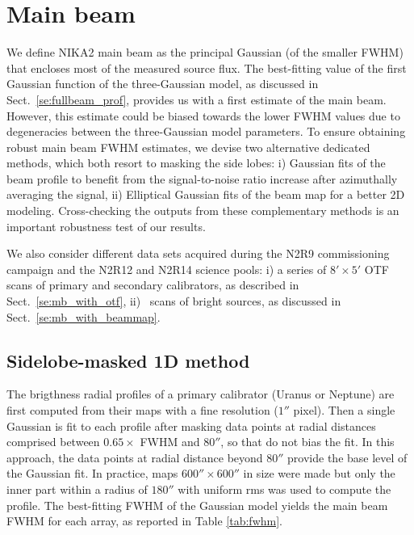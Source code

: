 \section{Main beam}%
\label{se:MB}


We define NIKA2 main beam as the principal Gaussian (of the smaller FWHM)
that encloses most of the measured source flux. The best-fitting value
of the first Gaussian function of the
three-Gaussian model, as discussed in Sect.~\ref{se:fullbeam_prof},
provides us with a first estimate of the main beam. %
However, this estimate could be biased towards the lower FWHM values due to
degeneracies between the three-Gaussian model parameters. To ensure
obtaining robust main beam FWHM estimates, we devise %
two alternative dedicated
methods, which both resort to masking the side lobes: i) Gaussian fits
of the beam profile to benefit from the signal-to-noise ratio increase
after azimuthally averaging the signal, ii) Elliptical Gaussian fits
of the beam map for a better 2D modeling.
Cross-checking the outputs from these complementary methods is an
important robustness test of our results.

We also consider different data sets acquired during the N2R9
commissioning campaign and the N2R12 and N2R14 science pools: i) a
series of $8' \times 5'$ OTF scans of primary and secondary
calibrators, as described in Sect.~\ref{se:mb_with_otf}, ii)
\bm\ scans of bright sources, as discussed in
Sect.~\ref{se:mb_with_beammap}.



\subsection{Sidelobe-masked 1D method}%
\label{se:beam_mb_1D} 

The brigthness radial profiles of a primary calibrator (Uranus or
Neptune) are first computed from their maps with a fine resolution
($1''$ pixel). Then a single Gaussian is fit to each profile after
masking data points at radial distances comprised between
$0.65 \times$ FWHM and $80''$, so that 
do not bias the fit. In this approach, the data points at radial
distance beyond $80''$ provide the base level of the Gaussian fit. In
practice, maps $600'' \times 600''$ in size were made but only the
inner part within a radius of $180''$ with uniform rms was used to
compute the profile.
The best-fitting FWHM of the Gaussian model
yields the main beam FWHM for each array, as reported in Table
\ref{tab:fwhm}.

